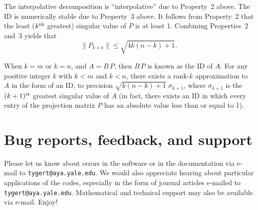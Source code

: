 ﻿\documentclass[letterpaper,12pt]{article}
\def\st{{\hbox{\scriptsize{\rm st}}}}
\def\th{{\hbox{\scriptsize{\rm th}}}}
\begin{document}
The interpolative decomposition is ``interpolative''
due to Property~2 above. The ID is numerically stable
due to Property~3 above.
It follows from Property~2 that the least ($k^\th$ greatest) singular value
of $P$ is at least 1. Combining Properties~2 and~3 yields that
%
\begin{equation}
\| P_{k \times n} \| \le \sqrt{4k(n-k)+1}.
\end{equation}

When $k = m$ or $k = n$, and $A = B \, P$,
then $B \, P$ is known as the ID of $A$.
For any positive integer $k$ with $k < m$ and $k < n$,
there exists a rank-$k$ approximation to $A$ in the form of an ID,
to precision $\sqrt{k(n-k)+1} \; \sigma_{k+1}$,
where $\sigma_{k+1}$ is the $(k+1)^\st$ greatest singular value of $A$
(in fact, there exists an ID in which every entry
of the projection matrix $P$ has an absolute value less than or equal
to 1).



\section{Bug reports, feedback, and support}

Please let us know about errors in the software or in the documentation
via e-mail to {\tt tygert@aya.yale.edu}.
We would also appreciate hearing about particular applications of the codes,
especially in the form of journal articles
e-mailed to {\tt tygert@aya.yale.edu}.
Mathematical and technical support may also be available via e-mail. Enjoy!





\end{document}
